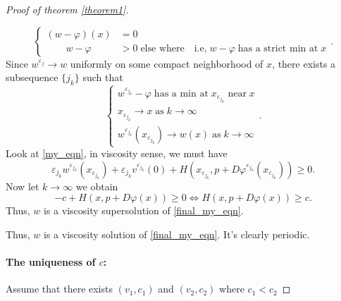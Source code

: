 \documentclass[12pt, oneside]{amsart}  	%
\begin{document}
\begin{proof}[Proof of theorem \ref{theorem1}]
\begin{itemize}
\begin{equation*}
\begin{cases}
(w - \varphi)(x) &= 0\\
\qquad w - \varphi &>0 \;\text{else where}\quad \text{i.e,}\; w-\varphi\;\text{has a strict min at}\; x
\end{cases}.
\end{equation*}
Since $w^{\varepsilon_j}\longrightarrow w$ uniformly on some compact neighborhood of $x$, there exists a subsequence $\{j_k\}$ such that 
\begin{equation*}
\begin{cases}
w^{\varepsilon_{j_k}} - \varphi \;\text{has a min at}\; x_{\varepsilon_{j_k}}\;\text{near}\;x\\
x_{\varepsilon_{j_k}} \longrightarrow x \;\text{as}\; k\longrightarrow\infty\\
w^{\varepsilon_{j_k}}\left(x_{\varepsilon_{j_k}}\right) \longrightarrow w(x) \;\text{as}\; k\longrightarrow\infty
\end{cases}.
\end{equation*}
Look at \eqref{my_eqn}, in viscosity sense, we must have
\begin{equation*}
\varepsilon_{j_k}
w^{\varepsilon_{j_k}}\left(x_{\varepsilon_{j_k}}\right) + 
\varepsilon_{j_k} v^{\varepsilon_{j_k}}(0) +
H(x_{\varepsilon_{j_k}},p+ D\varphi^{\varepsilon_{j_k}}(x_{\varepsilon_{j_k}})) \geq 0.
\end{equation*}
Now let $k\longrightarrow \infty$ we obtain 
\begin{equation*}
-c + H(x,p+D\varphi(x)) \geq 0 \Longleftrightarrow H(x,p+D\varphi(x)) \geq c.
\end{equation*}
Thus, $w$ is a viscosity supersolution of \eqref{final_my_eqn}.
\end{itemize}
Thus, $w$ is a viscosity solution of \eqref{final_my_eqn}. It's clearly periodic.\\


\paragraph{\textbf{The uniqueness of $c$:}} Assume that there exists $(v_1,c_1)$ and $(v_2,c_2)$ where $c_1<c_2$ 


\end{proof}
\end{document}
